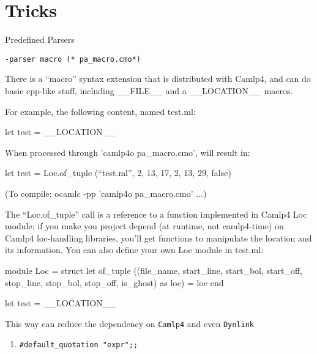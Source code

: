 \section{Tricks}


Predefined Parsers


\verb|-parser macro (* pa_macro.cmo*)| 



There is a ``macro'' syntax extension that is distributed with Camlp4,
and can do basic cpp-like stuff, including __FILE__ and a __LOCATION__
macros.

For example, the following content, named test.ml:
\begin{ocamlcode}
  let test =
    __LOCATION__
\end{ocamlcode}


When processed through 'camlp4o pa_macro.cmo', will result in:


\begin{ocamlcode}
  let test = Loc.of_tuple (``test.ml'', 2, 13, 17, 2, 13, 29, false)
\end{ocamlcode}


(To compile:  ocamlc -pp 'camlp4o pa_macro.cmo' ...)

The ``Loc.of_tuple'' call is a reference to a function implemented in
Camlp4 Loc module; if you make you project depend (at runtime, not
camlp4-time) on Camlp4 loc-handling libraries, you'll get functions to
manipulate the location and its information. You can also define your
own Loc module in test.ml:
\begin{ocamlcode}
  module Loc = struct
    let of_tuple
      ((file_name, start_line, start_bol, start_off, stop_line,
stop_bol, stop_off, is_ghost) as loc) =
        loc
  end

  let test =
    __LOCATION__
\end{ocamlcode}

This way can reduce the dependency on \verb|Camlp4| and even \verb|Dynlink|

\begin{enumerate}
\item \verb|#default_quotation "expr";; |
\end{enumerate}
